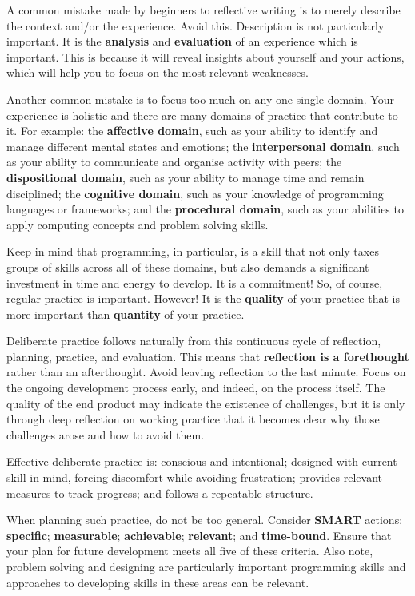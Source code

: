 \documentclass{../../fal_assignment}
\begin{document}
A common mistake made by beginners to reflective writing is to merely describe the context and/or the experience. Avoid this. Description is not particularly important. It is the \textbf{analysis} and \textbf{evaluation} of an experience which is important. This is because it will reveal insights about yourself and your actions, which will help you to focus on the most relevant weaknesses.

Another common mistake is to focus too much on any one single domain. Your experience is holistic and there are many domains of practice that contribute to it. For example: the \textbf{affective domain}, such as your ability to identify and manage different mental states and emotions; the \textbf{interpersonal domain}, such as your ability to communicate and organise activity with peers; the \textbf{dispositional domain}, such as your ability to manage time and remain disciplined; the \textbf{cognitive domain}, such as your knowledge of programming languages or frameworks; and the \textbf{procedural domain}, such as your abilities to apply computing concepts and problem solving skills. 

Keep in mind that programming, in particular, is a skill that not only taxes groups of skills across all of these domains, but also demands a significant investment in time and energy to develop. It is a commitment! So, of course, regular practice is important. However! It is the \textbf{quality} of your practice that is more important than \textbf{quantity} of your practice.

Deliberate practice follows naturally from this continuous cycle of reflection, planning, practice, and evaluation. This means that \textbf{reflection is a forethought} rather than an afterthought. Avoid leaving reflection to the last minute. Focus on the ongoing development process early, and indeed, on the process itself. The quality of the end product may indicate the existence of challenges, but it is only through deep reflection on working practice that it becomes clear why those challenges arose and how to avoid them.

Effective deliberate practice is: conscious and intentional; designed with current skill in mind, forcing discomfort while avoiding frustration; provides relevant measures to track progress; and follows a repeatable structure.

When planning such practice, do not be too general. Consider \textbf{SMART} actions: \textbf{specific}; \textbf{measurable}; \textbf{achievable}; \textbf{relevant}; and \textbf{time-bound}. Ensure that your plan for future development meets all five of these criteria. Also note, problem solving and designing are particularly important programming skills and approaches to developing skills in these areas can be relevant.
\end{document}
